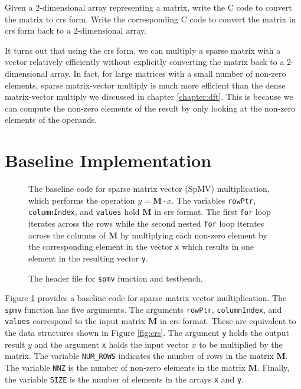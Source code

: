 \begin{exercise}
Given a 2-dimensional array representing a matrix, write the C code to convert the matrix to \gls{crs} form.  Write the corresponding C code to convert the matrix in \gls{crs} form back to a 2-dimensional array.
\end{exercise}

It turns out that using the \gls{crs} form, we can multiply a sparse matrix with a vector relatively efficiently without explicitly converting the matrix back to a 2-dimensional array.  In fact, for large matrices with a small number of non-zero elements, sparse matrix-vector multiply is much more efficient than the dense matrix-vector multiply we discussed in chapter \ref{chapter:dft}.  This is because we can compute the non-zero elements of the result by only looking at the non-zero elements of the operands. 

\section{Baseline Implementation}

\begin{figure}

\caption{  The baseline code for sparse matrix vector (SpMV) multiplication, which performs the operation $y = \mathbf{M} \cdot x$. The variables \lstinline{rowPtr}, \lstinline{columnIndex}, and \lstinline{values}  hold $\mathbf{M}$ in \gls{crs} format. The first \lstinline{for} loop iterates across the rows while the second nested \lstinline{for} loop iterates across the columns of $\mathbf{M}$ by multiplying each non-zero element by the corresponding element in the vector \lstinline{x} which results in one element in the resulting vector \lstinline{y}. }
\label{fig:spmv_arch1}
\end{figure}

\begin{figure}

\caption{ The header file for \lstinline{spmv} function and testbench.  }
\label{fig:spmv.h}
\end{figure}

Figure \ref{fig:spmv_arch1} provides a baseline code for sparse matrix vector multiplication. The \lstinline{spmv} function has five arguments. The arguments \lstinline{rowPtr}, \lstinline{columnIndex}, and \lstinline{values} correspond to the input matrix $\mathbf{M}$ in \gls{crs} format. These are equivalent to the data structures shown in Figure \ref{fig:crs}. The argument \lstinline{y} holds the output result $y$ and the argument \lstinline{x} holds the input vector $x$ to be multiplied by the matrix.  The variable \lstinline{NUM_ROWS} indicates the number of rows in the matrix $\mathbf{M}$. The variable \lstinline{NNZ} is the number of non-zero elements in the matrix $\mathbf{M}$. Finally, the variable \lstinline{SIZE} is the number of elements in the arrays \lstinline{x} and \lstinline{y}.

